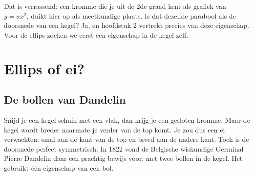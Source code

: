 
\begin{oefeningen}
\end{oefeningen}

Dat is verrassend: een kromme die je uit de 2de graad kent als grafiek van $y = ax^2$, duikt hier op als meetkundige plaats. Is dat dezelfde parabool als de doorsnede van een kegel? Ja, en hoofdstuk 2 vertrekt precies van deze eigenschap. Voor de ellips zoeken we eerst een eigenschap in de kegel zelf.

\section{Ellips of ei?}\label{sec:h1-dandelin}

\subsection{De bollen van Dandelin}

Snijd je een kegel schuin met een vlak, dan krijg je een gesloten kromme. Maar de kegel wordt breder naarmate je verder van de top komt. Je zou dus een ei verwachten: smal aan de kant van de top en breed aan de andere kant. Toch is de doorsnede perfect symmetrisch. In 1822 vond de Belgische wiskundige Germinal Pierre Dandelin daar een prachtig bewijs voor, met twee bollen in de kegel. Het gebruikt één eigenschap van een bol.


